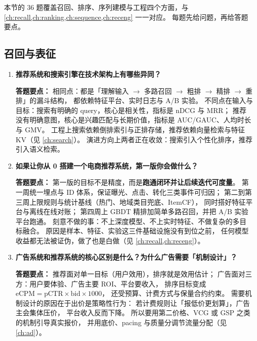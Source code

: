 本节的 36 题覆盖召回、排序、序列建模与工程四个方面，与 \cref{ch:recall,ch:ranking,ch:sequence,ch:receng} 一一对应。
每题先给问题，再给答题要点。

\subsection{召回与表征}

\begin{interview}[题库与答题要点]

\begin{enumerate}[label=]

  \item[\textcolor{VioletDeep}{\textbf{Q1.}}] \textbf{推荐系统和搜索引擎在技术架构上有哪些异同？}
\par\smallskip\noindent\textcolor{VioletDeep}{\textbf{答题要点：}}
相同点：都是「理解输入 $\to$ 多路召回 $\to$ 粗排 $\to$ 精排 $\to$ 重排」的漏斗结构，
都依赖特征平台、实时日志与 A/B 实验。
不同点在输入与目标：搜索有明确的 query，核心是相关性，指标是 nDCG 与 MRR；
推荐没有明确意图，核心是兴趣匹配与长期价值，指标是 AUC/GAUC、人均时长与 GMV。
工程上搜索依赖倒排索引与正排存储，推荐依赖向量检索与特征 KV（见 \cref{ch:search}）。
演进方向上两者正在收敛：搜索引入个性化排序，推荐引入语义检索。

  \item[\textcolor{VioletDeep}{\textbf{Q2.}}] \textbf{如果让你从 0 搭建一个电商推荐系统，第一版你会做什么？}
\par\smallskip\noindent\textcolor{VioletDeep}{\textbf{答题要点：}}
第一版的目标不是精度，而是\textbf{跑通闭环并让后续迭代可度量}。
第一周统一埋点与 ID 体系，保证曝光、点击、转化三类事件可归因；
第二到第三周上限规则与统计基线（热门、地域类目兜底、ItemCF），
同时搭好特征平台与离线在线对账；
第四周上 GBDT 精排加简单多路召回，并把 A/B 实验平台跑通。
刻意不做的事：不上深度模型、不上实时特征、不做复杂的多目标融合。
原因是样本、特征、实验这三件基础设施没有到位之前，
任何模型收益都无法被证伪，做了也是白做（见 \cref{ch:recall,ch:receng}）。

  \item[\textcolor{VioletDeep}{\textbf{Q3.}}] \textbf{广告系统和推荐系统的核心区别是什么？为什么广告需要「机制设计」？}
\par\smallskip\noindent\textcolor{VioletDeep}{\textbf{答题要点：}}
推荐面对单一目标（用户效用），排序就是效用估计；
广告面对三方：用户要体验、广告主要 ROI、平台要收入，
排序目标变成 $\text{eCPM} = \text{pCTR}\times\text{bid}\times 1000$，
还受预算、计费方式与保量合约约束。
需要机制设计的原因在于出价是策略性行为：
若计费规则让「报低价更划算」，广告主会集体压价，
平台收入反而下降。
所以要用第二价格、VCG 或 GSP 之类的机制引导真实报价，
并用底价、pacing 与质量分调节流量分配（见 \cref{ch:ad}）。


\end{enumerate}
\end{interview}
